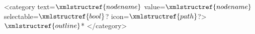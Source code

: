 <category text=$\xmlstructref{nodename}$
    value=$\xmlstructref{nodename}$ selectable=$\xmlstructref{bool}$? 
    icon=$\xmlstructref{path}$?>
        $\xmlstructref{outline}$*
</category>
